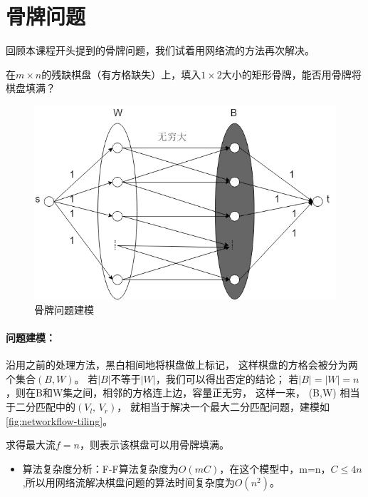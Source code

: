 \section{骨牌问题}\label{sec:network-flows-tiling}
回顾本课程开头提到的骨牌问题，我们试着用网络流的方法再次解决。
\begin{example}
	在\(m \times n\)的残缺棋盘（有方格缺失）上，填入\(1 \times 2\)大小的矩形骨牌，能否用骨牌将棋盘填满？
\end{example}

\begin{figure}[htb]
	\centering
	\includegraphics[scale=0.6]{image/networkflow4.png}
	\caption{骨牌问题建模}\label{fig:networkflow-tiling}
\end{figure}

\paragraph*{问题建模：}
沿用之前的处理方法，黑白相间地将棋盘做上标记，
这样棋盘的方格会被分为两个集合\((B,W)\)。
若\(|B|\)不等于\(|W|\)，我们可以得出否定的结论；
若\(|B|=|W|=n\)，则在B和W集之间，相邻的方格连上边，容量正无穷，
这样一来， (B,W) 相当于二分匹配中的\((V_l,\,V_r)\)，
就相当于解决一个最大二分匹配问题，建模如\autoref{fig:networkflow-tiling}。

求得最大流\(f=n\)，则表示该棋盘可以用骨牌填满。
\begin{itemize}
	\item 算法复杂度分析：F-F算法复杂度为\(O(mC)\)，在这个模型中，m=n，\(C \le 4n\),所以用网络流解决棋盘问题的算法时间复杂度为\(O(n^2)\)。
\end{itemize}

